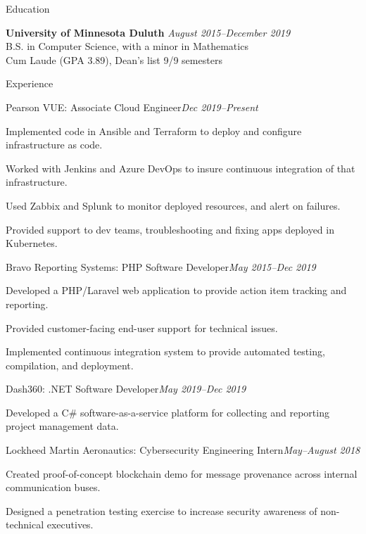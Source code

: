 \documentclass{resume} %
\begin{document}
\begin{rSection}{Education}

    {\bf University of Minnesota Duluth} \hfill {\em August 2015--December 2019} 
    \\ B.S. in Computer Science, with a minor in Mathematics
    \\ Cum Laude (GPA 3.89), Dean's list 9/9 semesters

\end{rSection}

\begin{rSection}{Experience}

    \begin{rSubsection}{Pearson VUE: \textnormal{Associate Cloud Engineer}}{\em Dec 2019--Present}{}{}
        \item Implemented code in Ansible and Terraform to deploy and configure infrastructure as code.
        \item Worked with Jenkins and Azure DevOps to insure continuous integration of that infrastructure.
        \item Used Zabbix and Splunk to monitor deployed resources, and alert on failures.
        \item Provided support to dev teams, troubleshooting and fixing apps deployed in Kubernetes.
    \end{rSubsection}

    \begin{rSubsection}{Bravo Reporting Systems: \textnormal{PHP Software Developer}}{\em May 2015--Dec 2019}{}{}
        \item Developed a PHP/Laravel web application to provide action item
            tracking and reporting.
        \item Provided customer-facing end-user support for technical issues.
        \item Implemented continuous integration system to provide automated testing,
            compilation, and deployment.
    \end{rSubsection}

    \begin{rSubsection}{Dash360: \textnormal{.NET Software Developer}}{\em May 2019--Dec 2019}{}{}
        \item Developed a C\# software-as-a-service platform for collecting and
            reporting project management data.
    \end{rSubsection}

    \begin{rSubsection}{Lockheed Martin Aeronautics: \textnormal{Cybersecurity Engineering Intern}}{\em May--August 2018}{}{}
        \item Created proof-of-concept blockchain demo for message provenance across internal communication buses.
        \item Designed a penetration testing exercise to increase security awareness of non-technical executives.
    \end{rSubsection}


\end{rSection}
\end{document}
